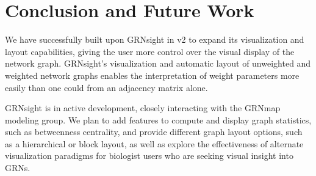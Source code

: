 \documentclass[sigconf,review]{acmart}
\begin{document}
\section{Conclusion and Future Work}
We have successfully built upon GRNsight in v2 to expand its visualization and layout capabilities, giving the user more control over the visual display of the network graph. GRNsight's visualization and automatic layout of unweighted and weighted network graphs enables the interpretation of weight parameters more easily than one could from an adjacency matrix alone.

GRNsight is in active development, closely interacting with the GRNmap modeling group. We plan to add features to compute and display graph statistics, such as betweenness centrality, and provide different graph layout options, such as a hierarchical or block layout, as well as explore the effectiveness of alternate visualization paradigms for biologist users who are seeking visual insight into GRNs.



\end{document}
